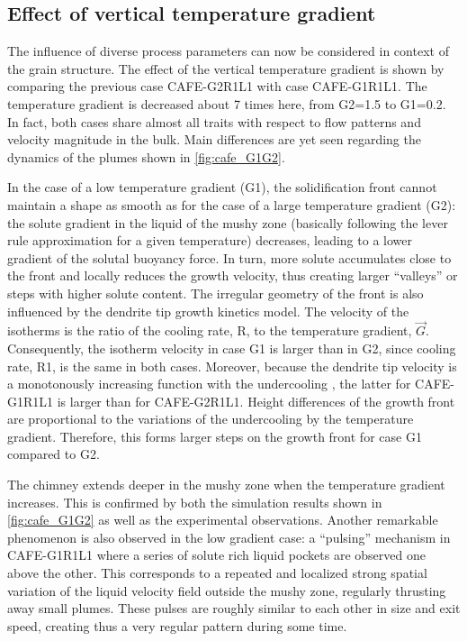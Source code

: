 \subsection{Effect of vertical temperature gradient}

The influence of diverse process parameters can now be considered in context of the grain structure. 
The effect of the vertical temperature gradient is shown by comparing the previous case CAFE-G2R1L1 
with case CAFE-G1R1L1. The temperature gradient is decreased about 7 times here, from G2=\SI{1.5}{\ugradT}
to G1=\SI{0.2}{\ugradT}. In fact, both cases share almost all traits with respect to flow patterns and velocity
magnitude in the bulk. Main differences are yet seen regarding the dynamics of the plumes shown in 
\cref{fig:cafe_G1G2}. 

In the case of a low temperature gradient (G1), the solidification front cannot maintain a 
shape as smooth as for the case of a large temperature gradient (G2): the solute gradient in the 
liquid of the mushy zone (basically following the lever rule approximation for a given temperature) 
decreases, leading to a lower gradient of the solutal buoyancy force. In turn, more solute accumulates 
close to the front and locally reduces the growth velocity, thus creating larger “valleys” or steps 
with higher solute content. The irregular geometry of the front is also influenced by the dendrite tip 
growth kinetics model. The velocity of the isotherms is the ratio of the cooling rate, R, to the 
temperature gradient, $\vec{G}$. Consequently, the isotherm velocity in case G1 is larger than in G2, since 
cooling rate, R1, is the same in both cases. Moreover, because the dendrite tip velocity is a monotonously 
increasing function with the undercooling \citep{gandin_boundary_2003}, the latter for CAFE-G1R1L1 is larger 
than for CAFE-G2R1L1. Height differences of the growth front are proportional to the variations of the 
undercooling by the temperature gradient. Therefore, this forms larger steps on the growth front for case 
G1 compared to G2. 

The chimney extends deeper in the mushy zone when the temperature gradient increases. 
This is confirmed by both the simulation results shown in \cref{fig:cafe_G1G2} as well as the experimental observations. 
Another remarkable phenomenon is also observed in the low gradient case: a “pulsing” mechanism in CAFE-G1R1L1 
where a series of solute rich liquid pockets are observed one above the other. This corresponds to a repeated
and localized strong spatial variation of the liquid velocity field outside the mushy zone, regularly thrusting 
away small plumes. These pulses are roughly similar to each other in size and exit speed, creating thus a very 
regular pattern during some time. 

